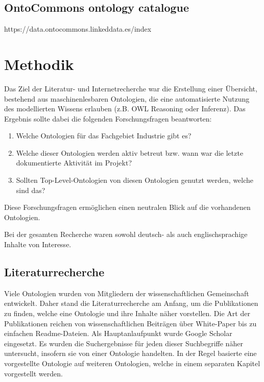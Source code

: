 \documentclass{article}
\begin{document}
\subsection{OntoCommons ontology catalogue}

https://data.ontocommons.linkeddata.es/index

\section{Methodik}

Das Ziel der Literatur- und Internetrecherche war die Erstellung einer Übersicht, bestehend aus maschinenlesbaren Ontologien, die eine automatisierte Nutzung des modellierten Wissens erlauben (z.B. OWL Reasoning oder Inferenz).
Das Ergebnis sollte dabei die folgenden Forschungsfragen beantworten:

\begin{enumerate}
    \item Welche Ontologien für das Fachgebiet Industrie gibt es?
    \item Welche dieser Ontologien werden aktiv betreut bzw. wann war die letzte dokumentierte Aktivität im Projekt?
    \item Sollten Top-Level-Ontologien von diesen Ontologien genutzt werden, welche sind das?
\end{enumerate}

Diese Forschungsfragen ermöglichen einen neutralen Blick auf die vorhandenen Ontologien.

Bei der gesamten Recherche waren sowohl deutsch- als auch englischsprachige Inhalte von Interesse.

\subsection{Literaturrecherche}

Viele Ontologien wurden von Mitgliedern der wissenschaftlichen Gemeinschaft entwickelt.
Daher stand die Literaturrecherche am Anfang, um die Publikationen zu finden, welche eine Ontologie und ihre Inhalte näher vorstellen.
Die Art der Publikationen reichen von wissenschaftlichen Beiträgen über White-Paper bis zu einfachen Readme-Dateien.
Als Hauptanlaufpunkt wurde Google Scholar eingesetzt.
Es wurden die Suchergebnisse für jeden dieser Suchbegriffe näher untersucht, insofern sie von einer Ontologie handelten.
In der Regel basierte eine vorgestellte Ontologie auf weiteren Ontologien, welche in einem separaten Kapitel vorgestellt werden.
\end{document}

